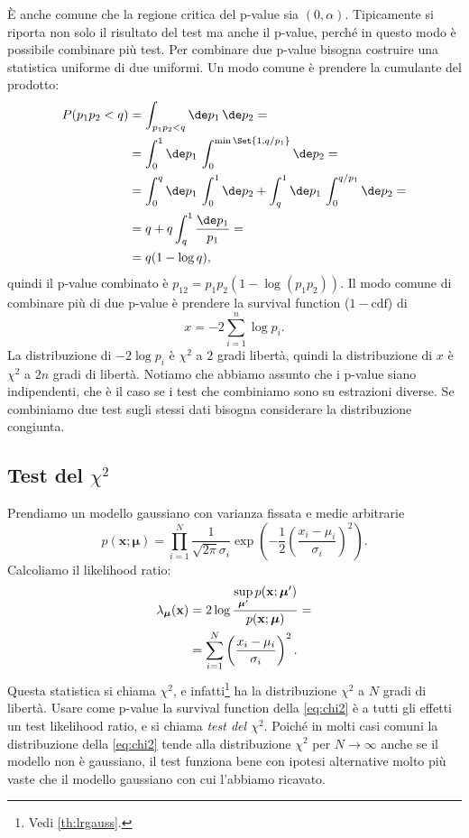 \noindent È anche comune che la regione critica del p-value sia $(0,\alpha)$.
Tipicamente si riporta non solo il risultato del test ma anche il p-value,
perché in questo modo è possibile combinare più test.
Per combinare due p-value bisogna costruire una statistica uniforme di due uniformi.
Un modo comune è prendere la cumulante del prodotto:
\begin{align*}
	P(p_1p_2<q)
	&= \int_{p_1p_2<q}\de p_1\,\de p_2 = \\
	&= \int_0^1\de p_1\, \int_0^{\min\Set{1,q/p_1}} \de p_2 = \\
	&= \int_0^q\de p_1\, \int_0^1 \de p_2
	+ \int_q^1 \de p_1\, \int_0^{q/p_1} \de p_2 = \\
	&= q + q\int_q^1 \frac{\de p_1}{p_1} = \\
	&= q(1-\log q),
\end{align*}
quindi il p-value combinato è $p_{12} = p_1p_2(1-\log(p_1p_2))$.
Il modo comune di combinare più di due p-value è prendere la survival function ($1-\text{cdf}$) di
\begin{equation*}
	x = -2 \sum_{i=1}^n \log p_i.
\end{equation*}
La distribuzione di $-2\log p_i$ è $\chi^2$ a 2 gradi libertà,
quindi la distribuzione di $x$ è $\chi^2$ a $2n$ gradi di libertà.
Notiamo che abbiamo assunto che i p-value siano indipendenti,
che è il caso se i test che combiniamo sono su estrazioni diverse.
Se combiniamo due test sugli stessi dati
bisogna considerare la distribuzione congiunta.

\subsection{Test del $\chi^2$}

Prendiamo un modello gaussiano con varianza fissata e medie arbitrarie
\begin{equation*}
	p(\mathbf x;\boldsymbol\mu)
	= \prod_{i=1}^N \frac1{\sqrt{2\pi}\sigma_i}
	\exp\left(-\frac12\left(\frac{x_i-\mu_i}{\sigma_i}\right)^2\right).
\end{equation*}
Calcoliamo il likelihood ratio:
\begin{align}
	\lambda_{\boldsymbol\mu}(\mathbf x)
	&= 2\log \frac
	{\sup\limits_{\boldsymbol\mu'} p(\mathbf x;\boldsymbol\mu')}
	{p(\mathbf x;\boldsymbol\mu)} = \notag \\
	&= \sum_{i=1}^N \left(\frac{x_i-\mu_i}{\sigma_i}\right)^2. \label{eq:chi2}
\end{align}
Questa statistica si chiama $\chi^2$,
e infatti\footnote{Vedi \autoref{th:lrgauss}.} ha la distribuzione $\chi^2$ a $N$ gradi di libertà.
Usare come p-value la survival function della \eqref{eq:chi2}
è a tutti gli effetti un test likelihood ratio,
e si chiama \emph{test del $\chi^2$}.
Poiché in molti casi comuni la distribuzione della \eqref{eq:chi2} tende alla distribuzione $\chi^2$
per $N\to\infty$ anche se il modello non è gaussiano,
il test funziona bene con ipotesi alternative molto più vaste che il modello gaussiano con cui l'abbiamo ricavato.

